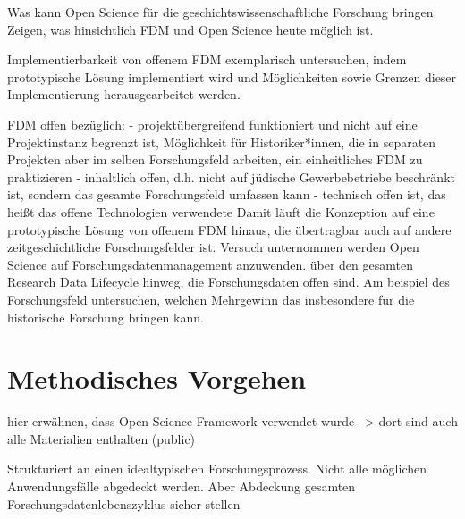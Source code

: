Was kann Open Science für die geschichtswissenschaftliche Forschung bringen. 
Zeigen, was hinsichtlich FDM und Open Science heute möglich ist.

Implementierbarkeit von offenem FDM exemplarisch untersuchen, indem prototypische Lösung implementiert wird und Möglichkeiten sowie Grenzen dieser Implementierung herausgearbeitet werden.   

FDM offen bezüglich:
- projektübergreifend funktioniert und nicht auf eine Projektinstanz begrenzt ist, Möglichkeit für Historiker*innen, die in separaten Projekten aber im selben Forschungsfeld arbeiten, ein einheitliches FDM zu praktizieren
- inhaltlich offen, d.h. nicht auf jüdische Gewerbebetriebe beschränkt ist, sondern das gesamte Forschungsfeld umfassen kann
- technisch offen ist, das heißt das offene Technologien verwendete
Damit läuft die Konzeption auf eine prototypische Lösung von offenem FDM hinaus, die übertragbar auch auf andere zeitgeschichtliche Forschungsfelder ist.
Versuch unternommen werden Open Science auf Forschungsdatenmanagement anzuwenden. über den gesamten Research Data Lifecycle hinweg, die Forschungsdaten offen sind. Am beispiel des Forschungsfeld untersuchen, welchen Mehrgewinn das insbesondere für die historische Forschung bringen kann. 

\section{Methodisches Vorgehen}

hier erwähnen, dass Open Science Framework verwendet wurde --> dort sind auch alle Materialien enthalten (public)

Strukturiert an einen idealtypischen Forschungsprozess. Nicht alle möglichen Anwendungsfälle abgedeckt werden. Aber Abdeckung gesamten Forschungsdatenlebenszyklus sicher stellen